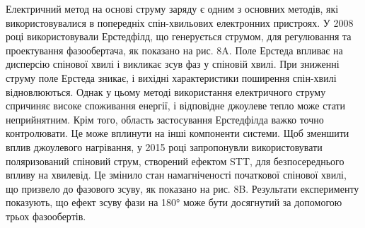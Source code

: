 \documentclass[a4paper,14pt]{extreport}
\begin{document}
 Електричний метод на основі струму заряду є одним з основних методів, які використовувалися в попередніх спін-хвильових електронних пристроях. У 2008 році\cite{lit6} використовували Ерстедфілд, що генерується струмом, для регулювання та проектування фазообертача, як показано на рис. 8A. Поле Ерстеда впливає на дисперсію спінової хвилі і викликає зсув фаз у спіновій хвилі. При зниженні струму поле Ерстеда зникає, і вихідні характеристики поширення спін-хвилі відновлюються. Однак у цьому методі використання електричного струму спричиняє високе споживання енергії, і відповідне джоулеве тепло може стати неприйнятним. Крім того, область застосування Ерстедфілда важко точно контролювати. Це може вплинути на інші компоненти системи. Щоб зменшити вплив джоулевого нагрівання, у 2015 році  запропонувли використовувати поляризований спіновий струм, створений ефектом STT, для безпосереднього впливу на хвилевід. Це змінило стан намагніченості початкової спінової хвилі, що призвело до фазового зсуву, як показано на рис. 8B. Результати експерименту показують, що ефект зсуву фази на 180° може бути досягнутий за допомогою трьох фазообертів. 
\begin{figure}[h]
   \caption{}
 \end{figure}
\end{document}
